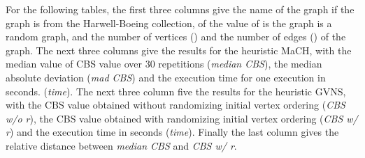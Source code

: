 \documentclass{scrartcl}
\theoremstyle{plain}
\newcommand{\algo}{MaCH}
\newcommand{\gvns}{GVNS}
\newcommand{\cbs}{CBS}
\begin{document}
\clearpage


For the following tables, the first three columns give the name of the 
graph if the graph is from the Harwell-Boeing collection, of the value of 
 is the graph is a random graph, and the number of vertices 
(\emph{}) and the number of edges (\emph{}) of the graph. The next 
three columns give the results for the heuristic \algo{}, with the median value 
of \cbs{} value over 30 repetitions (\emph{median \cbs{}}), the median absolute 
deviation (\emph{mad \cbs{}}) and the execution time for one execution in 
seconds. (\emph{time}). The next three column five the results for the heuristic 
\gvns{}, with the \cbs{} value obtained without randomizing initial vertex 
ordering (\emph{\cbs{} w/o r}), the \cbs{} value obtained with randomizing 
initial vertex ordering (\emph{\cbs{} w/ r}) and the execution time in seconds 
(\emph{time}). Finally the last column gives the relative distance between 
\emph{median \cbs{}} and \emph{\cbs{} 
w/ r}.
\end{document}
